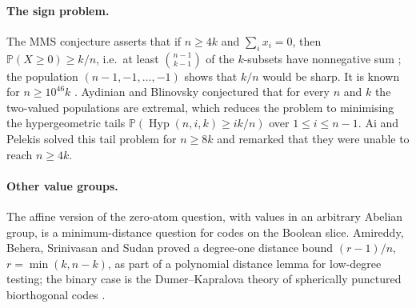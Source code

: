 \documentclass[11pt]{article}
\theoremstyle{remark}
\newcommand{\Prb}{\mathbb P}
\newcommand{\Hyp}{\operatorname{Hyp}}
\begin{document}
\paragraph{The sign problem.}
The MMS conjecture asserts that if \(n\ge4k\) and \(\sum_ix_i=0\), then
\(\Prb(X\ge0)\ge k/n\), i.e.\ at least \(\binom{n-1}{k-1}\) of the
\(k\)-subsets have nonnegative sum \cite{MS88}; the population
\((n-1,-1,\ldots,-1)\) shows that \(k/n\) would be sharp. It is known for
\(n\ge10^{46}k\) \cite{Pok}. Aydinian and Blinovsky \cite{AB} conjectured that
for every \(n\) and \(k\) the two-valued populations are extremal, which
reduces the problem to minimising the hypergeometric tails
\(\Prb(\Hyp(n,i,k)\ge ik/n)\) over \(1\le i\le n-1\). Ai and Pelekis
\cite{AP} solved this tail problem for \(n\ge8k\) and remarked that they were
unable to reach \(n\ge4k\).

\paragraph{Other value groups.}
The affine version of the zero-atom question, with values in an arbitrary
Abelian group, is a minimum-distance question for codes on the Boolean slice.
Amireddy, Behera, Srinivasan and Sudan \cite{ABSS} proved a degree-one
distance bound \((r-1)/n\), \(r=\min(k,n-k)\), as part of a polynomial
distance lemma for low-degree testing; the binary case is the
Dumer--Kapralova theory of spherically punctured biorthogonal codes
\cite{DK,BCIM}.
\end{document}
